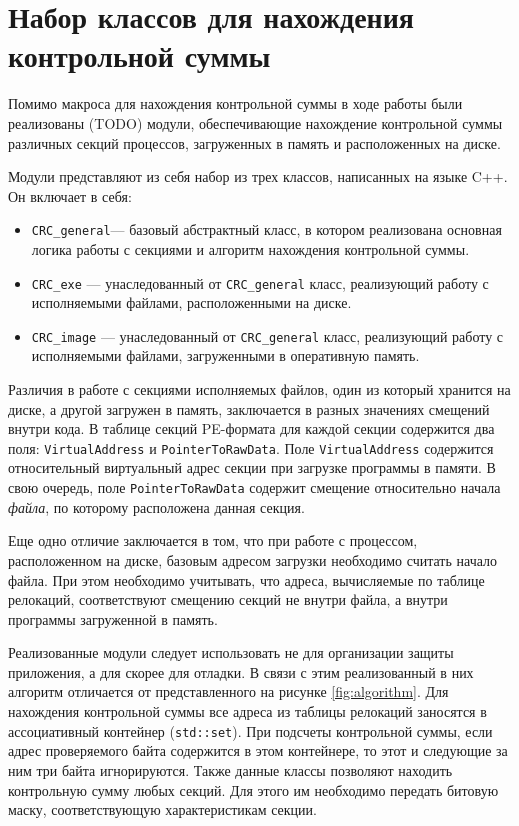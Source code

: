 
\section{Набор классов для нахождения контрольной суммы}

Помимо макроса для нахождения контрольной суммы в ходе работы были реализованы
(TODO) модули, обеспечивающие нахождение контрольной суммы различных секций 
процессов, загруженных в память и расположенных на диске.

Модули представляют из себя набор из трех классов, написанных на языке C++. Он
включает в себя:
\begin{itemize}
  \item \verb!CRC_general!--- базовый абстрактный класс, в котором реализована
    основная логика работы с секциями и алгоритм нахождения контрольной суммы.
  \item \verb!CRC_exe! --- унаследованный от \verb!CRC_general! класс,
    реализующий работу с исполняемыми файлами, расположенными на диске.
  \item \verb!CRC_image! --- унаследованный от \verb!CRC_general! класс,
    реализующий работу с исполняемыми файлами, загруженными в оперативную
    память.
\end{itemize}

Различия в работе с секциями исполняемых файлов, один из который хранится на
диске, а другой загружен в память, заключается в разных значениях смещений
внутри кода. В таблице секций PE-формата для каждой секции содержится два поля:
\verb!VirtualAddress! и \verb!PointerToRawData!. Поле \verb!VirtualAddress!
содержится относительный виртуальный адрес секции при загрузке программы в
памяти. В свою очередь, поле \verb!PointerToRawData! содержит смещение
относительно начала \textit{файла}, по которому расположена данная секция.

Еще одно отличие заключается в том, что при работе с процессом, расположенном на
диске, базовым адресом загрузки необходимо считать начало файла. При этом
необходимо учитывать, что адреса, вычисляемые по таблице релокаций,
соответствуют смещению секций не внутри файла, а внутри программы загруженной в
память.

Реализованные модули следует использовать не для организации защиты приложения,
а для скорее для отладки. В связи с этим реализованный в них алгоритм отличается
от представленного на рисунке \ref{fig:algorithm}. Для нахождения контрольной
суммы все адреса из таблицы релокаций заносятся в ассоциативный контейнер
(\verb!std::set!). При подсчеты контрольной суммы, если адрес проверяемого байта
содержится в этом контейнере, то этот и следующие за ним три байта игнорируются.
Также данные классы позволяют находить контрольную сумму любых секций. Для этого
им необходимо передать битовую маску, соответствующую характеристикам секции.

